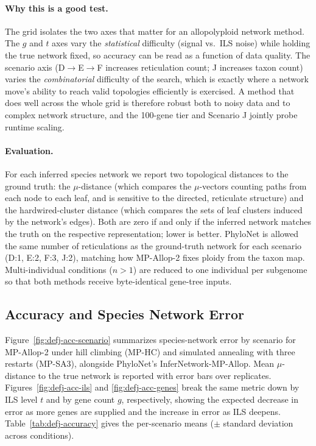 \documentclass{article}
\begin{document}
\paragraph{Why this is a good test.} The grid isolates the two axes that matter
for an allopolyploid network method. The $g$ and $t$ axes vary the
\emph{statistical} difficulty (signal vs.\ ILS noise) while holding the true
network fixed, so accuracy can be read as a function of data quality. The
scenario axis (D$\to$E$\to$F increases reticulation count; J increases taxon
count) varies the \emph{combinatorial} difficulty of the search, which is
exactly where a network move's ability to reach valid topologies efficiently is
exercised. A method that does well across the whole grid is therefore robust
both to noisy data and to complex network structure, and the 100-gene tier and
Scenario J jointly probe runtime scaling.

\paragraph{Evaluation.} For each inferred species network we report two
topological distances to the ground truth: the $\mu$-distance (which compares
the $\mu$-vectors counting paths from each node to each leaf, and is sensitive
to the directed, reticulate structure) and the hardwired-cluster distance
(which compares the sets of leaf clusters induced by the network's edges).
Both are zero if and only if the inferred network matches the truth on the
respective representation; lower is better. PhyloNet is allowed the same number
of reticulations as the ground-truth network for each scenario (D:1, E:2, F:3,
J:2), matching how MP-Allop-2 fixes ploidy from the taxon map. Multi-individual
conditions ($n>1$) are reduced to one individual per subgenome so that both
methods receive byte-identical gene-tree inputs.

\subsection{\color{bluem}Accuracy and Species Network Error}\label{sec:accuracy}

Figure~\ref{fig:defj-acc-scenario} summarizes species-network error by scenario
for MP-Allop-2 under hill climbing (MP-HC) and simulated annealing with three
restarts (MP-SA3), alongside PhyloNet's InferNetwork-MP-Allop. Mean
$\mu$-distance to the true network is reported with error bars over replicates.
Figures~\ref{fig:defj-acc-ils} and \ref{fig:defj-acc-genes} break the same
metric down by ILS level $t$ and by gene count $g$, respectively, showing the
expected decrease in error as more genes are supplied and the increase in error
as ILS deepens. Table~\ref{tab:defj-accuracy} gives the per-scenario means
($\pm$ standard deviation across conditions).
\end{document}
